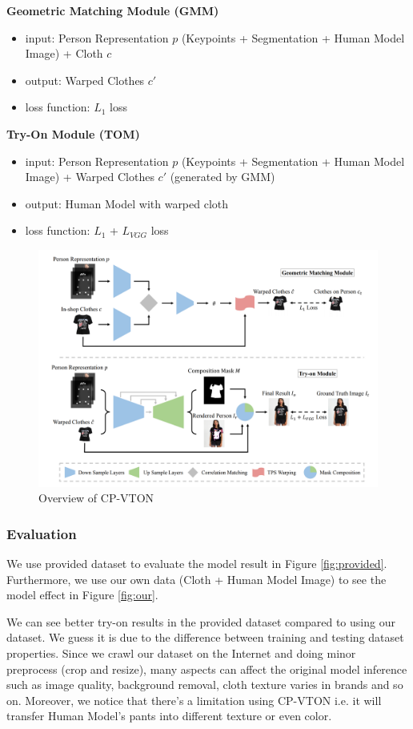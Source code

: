 \documentclass{article}
\begin{document}
\textbf{Geometric Matching Module (GMM)}
    \begin{itemize}
        \item input: Person Representation $p$ (Keypoints + Segmentation + Human Model Image) + Cloth $c$
        \item output: Warped Clothes $c'$
        \item loss function: $L_{1}$ loss
    \end{itemize}
\textbf{Try-On Module (TOM)}
    \begin{itemize}
        \item input: Person Representation $p$ (Keypoints + Segmentation + Human Model Image) + Warped Clothes $c'$ (generated by GMM)
        \item output: Human Model with warped cloth
        \item loss function: $L_{1}$  + $L_{VGG}$ loss
    \end{itemize}
\begin{figure}[H]
    \centering
    \includegraphics[width=1\textwidth]{cp-vton-imgs/CP-VTON-Model.png}
    \caption{Overview of CP-VTON}
    \label{fig:cp-vton}
\end{figure}

\subsubsection{Evaluation} 
We use provided dataset to evaluate the model result in Figure \ref{fig:provided}. Furthermore, we use our own data (Cloth + Human Model Image) to see the model effect in Figure \ref{fig:our}.

We can see better try-on results in the provided dataset compared to using our dataset. We guess it is due to the difference between training and testing dataset properties. Since we crawl our dataset on the Internet and doing minor preprocess (crop and resize), many aspects can affect the original model inference such as image quality, background removal, cloth texture varies in brands and so on. Moreover, we notice that there's a limitation using CP-VTON i.e. it will transfer Human Model's pants into different texture or even color.
\end{document}
